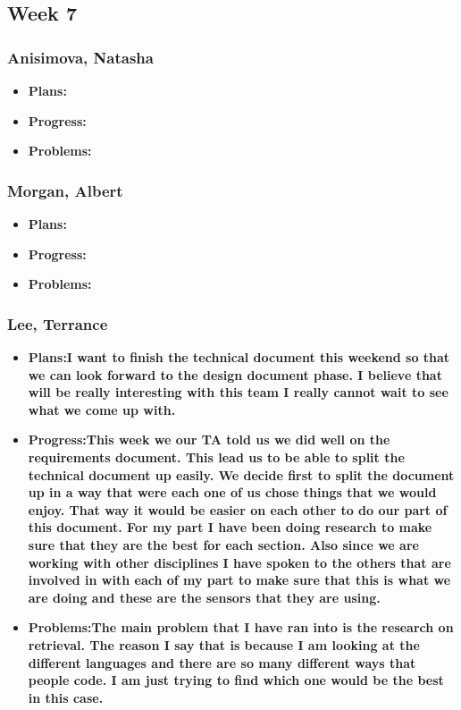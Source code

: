 \documentclass[10pt,draftclsnofoot,onecolumn]{IEEEtran}
\begin{document}
\subsection{Week 7}
\subsubsection{Anisimova, Natasha}
\begin{itemize}
	\item \textbf{Plans:}
	\item \textbf{Progress:}
	\item \textbf{Problems:}
\end{itemize}
\subsubsection{Morgan, Albert}
\begin{itemize}
	\item \textbf{Plans:}
	\item \textbf{Progress:}
	\item \textbf{Problems:}
\end{itemize}
\subsubsection{Lee, Terrance}
\begin{itemize}
	\item \textbf{Plans:I want to finish the technical document this weekend so that we can look forward to the design document phase. I believe that will be really interesting with this team I really cannot wait to see what we come up with.}
	\item \textbf{Progress:This week we our TA told us we did well on the requirements document. This lead us to be able to split the technical document up easily. We decide first to split the document up in a way that were each one of us chose things that we would enjoy. That way it would be easier on each other to do our part of this document. For my part I have been doing research to make sure that they are the best for each section. Also since we are working with other disciplines I have spoken to the others that are involved in with each of my part to make sure that this is what we are doing and these are the sensors that they are using.}
	\item \textbf{Problems:The main problem that I have ran into is the research on retrieval. The reason I say that is because I am looking at the different languages and there are so many different ways that people code. I am just trying to find which one would be the best in this case.}
\end{itemize}
\end{document}
